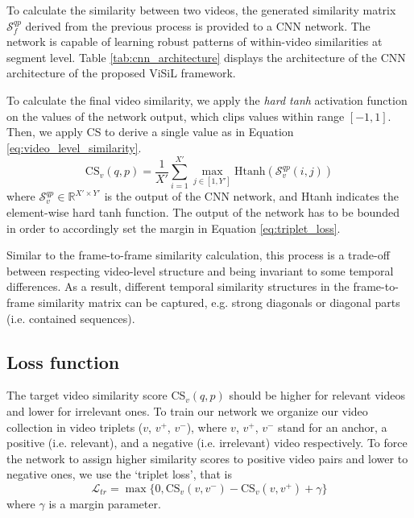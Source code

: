 \documentclass[10pt,twocolumn,letterpaper]{article}
\begin{document}
To calculate the similarity between two videos, the generated similarity matrix $\mathcal{S}_f^{qp}$ derived from the previous process is provided to a CNN network. The network is capable of learning robust patterns of within-video similarities at segment level. Table \ref{tab:cnn_architecture} displays the architecture of the CNN architecture of the proposed ViSiL framework. 

To calculate the final video similarity, we apply the \textit{hard tanh} activation function on the values of the network output, which clips values within range $[-1,1]$. 
Then, we apply CS to derive a single value as in Equation \ref{eq:video_level_similarity}. \begin{equation}
	\text{CS}_v(q, p) = \frac{1}{X'} \sum_{i=1}^{X'} \max_{j \in [1,Y']} \text{Htanh}(\mathcal{S}_v^{qp}(i, j))
	\label{eq:video_level_similarity}
\end{equation}
where $\mathcal{S}_v^{qp}\in\mathbb{R}^{X'\times Y'}$ is the output of the CNN network, and Htanh indicates the element-wise hard tanh function. The output of the network has to be bounded in order to accordingly set the margin in Equation \ref{eq:triplet_loss}. 

Similar to the frame-to-frame similarity calculation, this process is a trade-off between  respecting video-level structure and being invariant to some temporal differences. As a result, different temporal similarity structures in the frame-to-frame similarity matrix can be captured, e.g. strong diagonals or diagonal parts (i.e. contained sequences).


\subsection{Loss function}
\label{sec:loss_function}
The target video similarity score CS$_v(q, p)$ should be higher for relevant videos and lower for irrelevant ones. To train our network we organize our video collection in video triplets ($v$, $v^+$, $v^-$), where $v$, $v^+$, $v^-$ stand for an anchor, a positive (i.e. relevant), and a negative (i.e. irrelevant) video respectively. To force the network to assign higher similarity scores to positive video pairs and lower to negative ones, we use the `triplet loss', that is \begin{equation}
    \mathcal{L}_{tr} = \max\{0, \text{CS}_v(v, v^-) - \text{CS}_v(v, v^+) + \gamma\}
    \label{eq:triplet_loss}
\end{equation}
where $\gamma$ is a margin parameter. 
\end{document}
